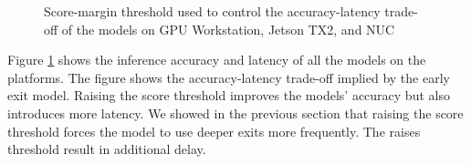 \begin{figure}
	\caption[Score-margin threshold and the Accuracy-Latency Trade-off]{Score-margin threshold used to control the accuracy-latency trade-off of the models on \protect{} GPU Workstation, \protect{} Jetson TX2, and \protect{} NUC }
	\label{fig:threshold-acc-lat-trade-off}
\end{figure}

Figure \ref{fig:threshold-acc-lat-trade-off} shows the inference accuracy and latency of all the models on the platforms. The figure shows the accuracy-latency trade-off implied by the early exit model.
Raising the score threshold improves the models' accuracy but also introduces more latency. We showed in the previous section that raising the score threshold forces the model to use deeper exits more frequently. The raises threshold result in additional delay. 


